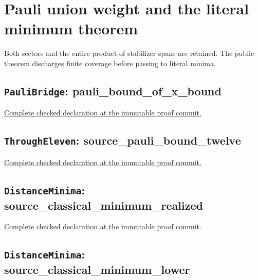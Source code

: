 \clearpage\section{Pauli union weight and the literal minimum theorem}

Both sectors and the entire product of stabilizer spans are retained. The public theorem discharges finite coverage before passing to literal minima.

\subsection*{\texttt{PauliBridge}: pauli\_bound\_of\_x\_bound}

\noindent\href{https://github.com/alectionary/vibe-math/blob/3ae21c0719cedbd928f4f7882f9b9e266567605e/formalization/distance-preservation/truncated12/PauliBridge.lean#L31-L42}{Complete checked declaration at the immutable proof commit.}



\subsection*{\texttt{ThroughEleven}: source\_pauli\_bound\_twelve}

\noindent\href{https://github.com/alectionary/vibe-math/blob/3ae21c0719cedbd928f4f7882f9b9e266567605e/formalization/distance-preservation/truncated12/ThroughEleven.lean#L27-L39}{Complete checked declaration at the immutable proof commit.}



\subsection*{\texttt{DistanceMinima}: source\_classical\_minimum\_realized}

\noindent\href{https://github.com/alectionary/vibe-math/blob/3ae21c0719cedbd928f4f7882f9b9e266567605e/formalization/distance-preservation/truncated12/DistanceMinima.lean#L24-L26}{Complete checked declaration at the immutable proof commit.}



\subsection*{\texttt{DistanceMinima}: source\_classical\_minimum\_lower}

